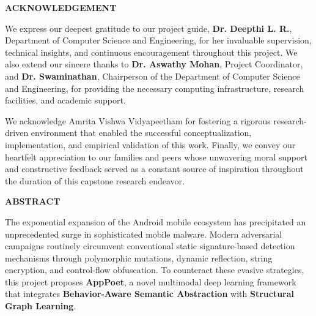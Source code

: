 \documentclass[12pt,a4paper,oneside]{report}
\begin{document}
{}
{\centering \Large\bfseries ACKNOWLEDGEMENT\par}
\vspace{0.5cm}
We express our deepest gratitude to our project guide, \textbf{Dr. Deepthi L. R.}, Department of Computer Science and Engineering, for her invaluable supervision, technical insights, and continuous encouragement throughout this project. We also extend our sincere thanks to \textbf{Dr. Aswathy Mohan}, Project Coordinator, and \textbf{Dr. Swaminathan}, Chairperson of the Department of Computer Science and Engineering, for providing the necessary computing infrastructure, research facilities, and academic support. 

We acknowledge Amrita Vishwa Vidyapeetham for fostering a rigorous research-driven environment that enabled the successful conceptualization, implementation, and empirical validation of this work. Finally, we convey our heartfelt appreciation to our families and peers whose unwavering moral support and constructive feedback served as a constant source of inspiration throughout the duration of this capstone research endeavor.

\clearpage
{}
{}
{\centering \Large\bfseries ABSTRACT\par}
\vspace{0.5cm}
The exponential expansion of the Android mobile ecosystem has precipitated an unprecedented surge in sophisticated mobile malware. Modern adversarial campaigns routinely circumvent conventional static signature-based detection mechanisms through polymorphic mutations, dynamic reflection, string encryption, and control-flow obfuscation. To counteract these evasive strategies, this project proposes \textbf{AppPoet}, a novel multimodal deep learning framework that integrates \textbf{Behavior-Aware Semantic Abstraction} with \textbf{Structural Graph Learning}. 
\end{document}
